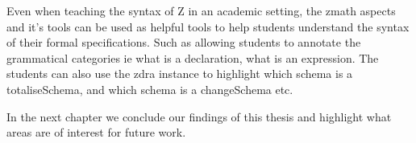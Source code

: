 Even when teaching the syntax of Z in an academic setting, the \gls{zmath}
aspects and it's tools can be used as helpful tools to help students understand
the syntax of their formal specifications. Such as allowing students to annotate
the grammatical categories ie what is a declaration, what is an expression. The
students can also use the \gls{zdra} instance to highlight which schema is a
totaliseSchema, and which schema is a changeSchema etc.

In the next chapter we conclude our findings of this thesis and highlight what
areas are of interest for future work.

%
%
%
%
%

